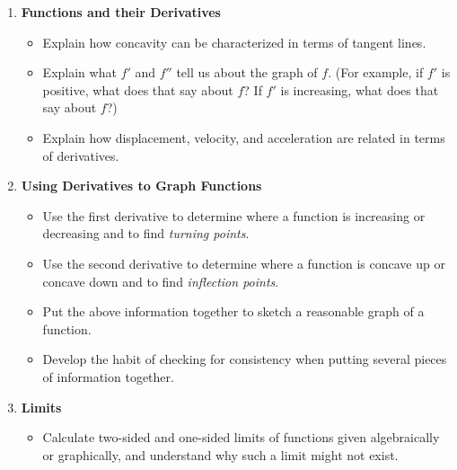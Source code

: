\documentclass{article}
\begin{document}
\begin{enumerate}
\begin{itemize}
  \item Determine whether a function is \emph{differentiable}, both
    graphically and algebraically, and give examples of functions that
    are differentiable and non-differentiable.

  \item Sketch a rough graph of $f'$ when you have the graph of $f$. 

  \end{itemize}

\item \textbf{Functions and their Derivatives} %
  \begin{itemize}

  \item Explain how concavity can be characterized in terms of tangent lines.

  \item Explain what $f'$ and $f''$ tell us about the graph of $f$. (For example, if $f'$ is positive, what does that say about $f$? If $f'$ is increasing, what does that say about $f$?)

  \item Explain how displacement, velocity, and acceleration are related in terms of derivatives.

  \end{itemize}

\item \textbf{Using Derivatives to Graph Functions} %
  \begin{itemize}

  \item Use the first derivative to determine where a function is
    increasing or decreasing and to find \emph{turning points}.

  \item Use the second derivative to determine where a function is
    concave up or concave down and to find \emph{inflection points}. 

  \item Put the above information together to sketch a reasonable graph
    of a function.

  \item Develop the habit of checking for consistency when putting several pieces of information together. 
  \end{itemize}

\item \textbf{Limits} %
  \begin{itemize}
  \item Calculate two-sided and one-sided limits of functions given algebraically or graphically, and understand why such a limit might not exist.


\end{itemize}
\end{enumerate}
\end{document}
